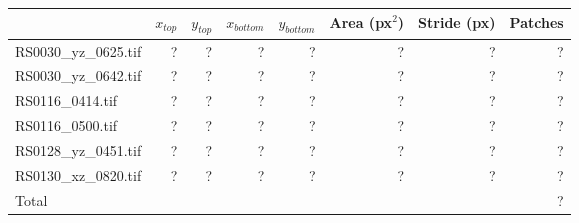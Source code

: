\begin{tabular}{@{}lrrrrrrr@{}}
\toprule
                        & $x_{top}$ & $y_{top}$ & $x_{bottom}$ & $y_{bottom}$ & Area (px$^2$) & Stride (px) & Patches \\ \midrule
RS0030\_yz\_0625.tif    & ?         & ?         & ?            & ?            & ?             & ?           & ?       \\
RS0030\_yz\_0642.tif    & ?         & ?         & ?            & ?            & ?             & ?           & ?       \\
RS0116\_0414.tif        & ?         & ?         & ?            & ?            & ?             & ?           & ?       \\
RS0116\_0500.tif        & ?         & ?         & ?            & ?            & ?             & ?           & ?       \\
RS0128\_yz\_0451.tif    & ?         & ?         & ?            & ?            & ?             & ?           & ?       \\
RS0130\_xz\_0820.tif    & ?         & ?         & ?            & ?            & ?             & ?           & ?       \\ \midrule
Total                   &           &           &              &              &               &             & ?       \\ \bottomrule
\end{tabular}